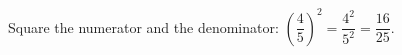 Square the numerator and the denominator: $\left(\dfrac{4}{5}\right)^2=\dfrac{4^2}{5^2}=\boxed{\dfrac{16}{25}}$.
